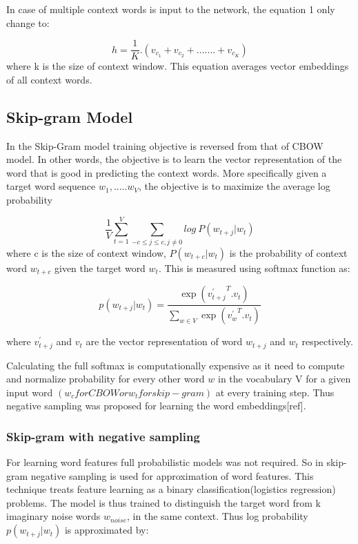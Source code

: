 In case of multiple context words is input to the network, the equation 1 only change to:

\begin{equation}
h= \frac {1}{K} .(v_{c_1}+v_{c_2}+.......+v_{c_K}) 
\end{equation}	
where k is the size of context window. This equation averages vector embeddings of all context words.

\subsection{Skip-gram Model}

In the Skip-Gram model training objective is reversed from that of CBOW model. In other words, the objective is to learn the vector representation of the word that is good in predicting the context words. More specifically given a target word sequence ${w_1,.....w_V}$, the objective is to maximize the average log probability 

\begin{equation}
\frac {1}{V}\sum_{t=1}^{V} \sum_{{-c \leq j \leq c},{j \neq 0}} {log\ P(w_{t+j}|w_t)}
\end{equation}
where c is the size of context window, $P(w_{t+c}|w_t)$ is the probability of context word $w_{t+c}$ given the target word $w_t$. This is measured using softmax function as:

\begin{equation}
p(w_{t+j}|w_t)=\frac {\exp({{v^{'}_{t+j}}^{T}}.{v_t})}{\sum_{w {\in}V} \exp({{v^{'}_{w}}^{T}}.{v_t})}
\end{equation}

where ${v^{'}_{t+j}}$ and ${v_t}$ are the vector representation of word $w_{t+j}$ and $w_{t}$ respectively.

Calculating the full softmax is computationally expensive as it need to compute and normalize probability for every other word $w$ in the vocabulary V for a given input word $(w_{c} for CBOW or w_{t} for skip-gram)$ at every training step. Thus negative sampling was proposed for learning the word embeddings[ref].

\subsubsection{Skip-gram with negative sampling}

For learning word features full probabilistic models was not required. So in skip-gram negative sampling is used for approximation of word features. This technique treats feature learning as a binary classification(logistics regression) problems. The model is thus trained to distinguish the target word from k imaginary noise words $w_{noise}$, in the same context. Thus log probability $p(w_{t+j}|w_t)$ is approximated by:

